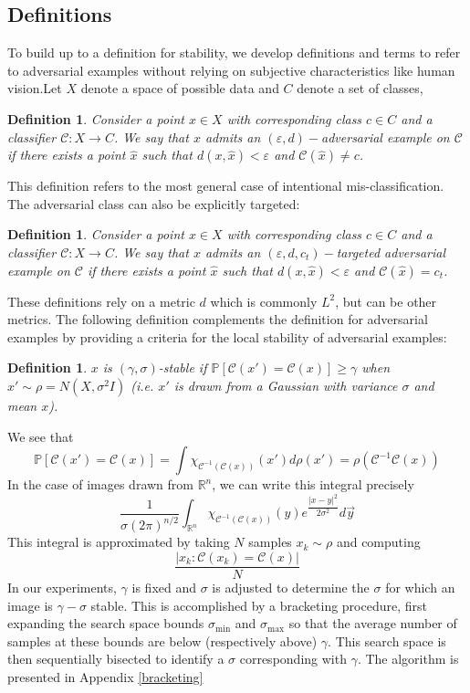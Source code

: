 \documentclass[10pt]{extarticle}
\newtheorem{definition}[theorem]{Definition}
\newcommand{\R}{\mathbb{R}}
\newcommand{\CC}{\mathcal{C}}
\newcommand{\norm}[1]{\left\lvert #1 \right\rvert}
\newcommand{\e}{\varepsilon}
\begin{document}
\subsection{Definitions}
To build up to a definition for stability, we develop definitions and terms to refer to adversarial examples without relying on subjective characteristics like human vision.Let $X$ denote a space of possible data and $C$ denote a set of classes,

\begin{definition}
Consider a point $x \in X$ with corresponding class $c \in C$ and a classifier $\CC: X \to C$. We say that $x$ admits an \emph{$(\e,d)-$adversarial example} on $\CC$ if there exists a point $\hat x$ such that $d(x,\hat x) < \e$ and $\CC(\hat x) \neq c$. 
\end{definition}
This definition refers to the most general case of intentional mis-classification. The adversarial class can also be explicitly targeted:
\begin{definition}
Consider a point $x \in X$ with corresponding class $c \in C$ and a classifier $\CC: X \to C$. We say that $x$ admits an \emph{$(\e,d,c_t)-$targeted adversarial example} on $\CC$ if there exists a point $\hat x$ such that $d(x,\hat x) < \e$ and $\CC(\hat x) = c_t$. 
\end{definition}

These definitions rely on a metric $d$ which is commonly $L^2$, but can be other metrics.
The following definition complements the definition for adversarial examples by providing a criteria for the local stability of adversarial examples: 
\begin{definition}
$x$ is \emph{$(\gamma,\sigma)$-stable} if $\mathbb{P}[\CC(x')=\CC(x)] \geq \gamma$ when $x' \sim \rho = N(X, \sigma^2 I)$ (i.e. $x'$ is drawn from a Gaussian with variance $\sigma$ and mean $x$).
\end{definition}
We see that  
\[\mathbb{P}[\CC(x')=\CC(x)] = \int \chi_{\CC^{-1}(\CC(x))} (x') d\rho (x') = \rho(\CC^{-1}\CC(x))\]
In the case of images drawn from $\R^n$, we can write this integral precisely
\[\dfrac{1}{\sigma(2\pi)^{n/2}} \int_{\R^n} \chi_{\CC^{-1}(\CC(x))} (y)e^{\dfrac{\norm{x - y}^2}{2\sigma^2}} d\vec y\]
This integral is approximated by taking $N$ samples $x_k \sim \rho$ and computing 
\[\dfrac{\norm{x_k : \CC(x_k) = \CC(x)}}{N}\]
In our experiments, $\gamma$ is fixed and $\sigma$ is adjusted to determine the $\sigma$ for which an image is $\gamma-\sigma$ stable. This is accomplished by a bracketing procedure, first expanding the search space bounds $\sigma_{\min}$ and $\sigma_{\max}$ so that the average number of samples at these bounds are below (respectively above) $\gamma$. This search space is then sequentially bisected to identify a $\sigma$ corresponding with $\gamma$. The algorithm is presented in Appendix \ref{bracketing}
\end{document}
